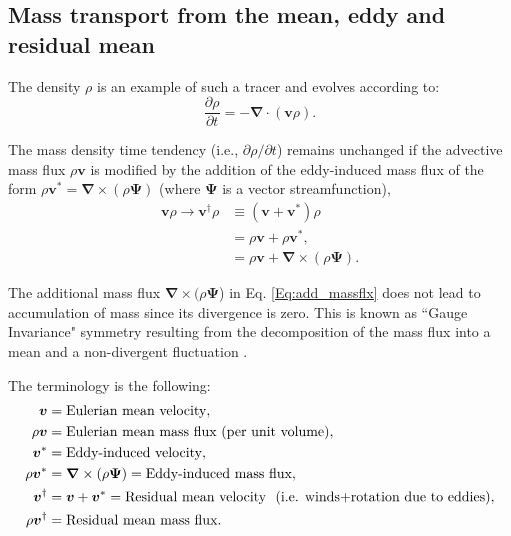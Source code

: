 \subsection{Mass transport from the mean, eddy and residual mean}

The density $\rho$ is an example of such a tracer and evolves according to:
\begin{equation}
    \frac{\partial \rho}{\partial t}= -\boldsymbol{\nabla} \cdot (\boldsymbol{v}\rho).
    \label{Eq:tend1}
\end{equation}

The mass density time tendency (i.e., $\partial \rho/\partial t$) remains unchanged if the advective mass flux $\rho \boldsymbol{v}$ is modified by the addition of the eddy-induced mass flux of the form $\rho\boldsymbol{v}^* = \boldsymbol{\nabla}\times(\rho\boldsymbol{\Psi})$ (where $\boldsymbol{\Psi}$ is a vector streamfunction),
\begin{align}
    \boldsymbol{v} \rho \rightarrow \boldsymbol{v}^\dagger \rho &\equiv (\boldsymbol{v} + \boldsymbol{v}^*) \rho \\
    & = \rho \boldsymbol{v} + \rho \boldsymbol{v}^*,\\
    & = \rho \boldsymbol{v} + \boldsymbol{\nabla}\times(\rho\boldsymbol{\Psi}).
        \label{Eq:add_massflx}
\end{align}

The additional mass flux $\boldsymbol{\nabla} \times (\rho \boldsymbol{\Psi}$) in Eq. \eqref{Eq:add_massflx} does not lead to accumulation of mass since its divergence is zero. This is known as ``Gauge Invariance" symmetry resulting from the decomposition of the mass flux into a mean and a non-divergent fluctuation \citep{Griffies2019}. 


The terminology is the following: %
\begin{subequations} %
\begin{align}
    \boldsymbol{v} &= \text{Eulerian mean velocity}, \\
    \rho \boldsymbol{v} &= \text{Eulerian mean mass flux (per unit volume)}, \\
    \boldsymbol{v}^* &= \text{Eddy-induced velocity}, \\
    \rho \boldsymbol{v}^* &= \boldsymbol{\nabla} \times (\rho \boldsymbol{\Psi}) = \text{Eddy-induced mass flux}, \label{Eq:eddy_mass_flx}\\
    \boldsymbol{v}^\dagger &= \boldsymbol{v}+\boldsymbol{v}^* = \text{Residual mean velocity \space (i.e. winds$+$rotation due to eddies)}, \\
    \rho \boldsymbol{v}^\dagger &= \text{Residual mean mass flux}. 
 \end{align} 
 \end{subequations}
 

